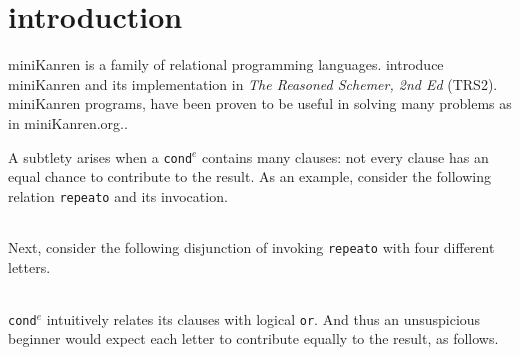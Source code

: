\documentclass[format=acmlarge, review=true, authordraft=true]{acmart}
\newcommand{\conde}{\texttt{cond$^e$}}
\newcommand{\clisting}[1]{
\begin{center}
  \begin{tabular}{c}
	
    \end{tabular}
\end{center}
}
\begin{document}
\section{introduction}

miniKanren is a family of relational programming languages.
\citet{friedman_reasoned_2018} introduce miniKanren and its
implementation in \emph{The Reasoned Schemer, 2nd Ed}
(TRS2). miniKanren programs, have been proven to be useful in solving 
many problems as in miniKanren.org.\citet{byrd2017unified}.







A subtlety arises 
when a \conde{} contains many clauses: not every clause has an 
equal chance to contribute to the result. As an example, consider the following 
relation \texttt{repeato} and its invocation. 

\clisting{Figures/repeato.rkt}

Next, consider the following disjunction of invoking \texttt{repeato} with four 
different letters.

\clisting{Figures/example.rkt}

\conde{} intuitively relates its clauses with logical \texttt{or}. And thus an 
unsuspicious beginner would expect each letter to contribute equally to the 
result, as follows.
\end{document}
